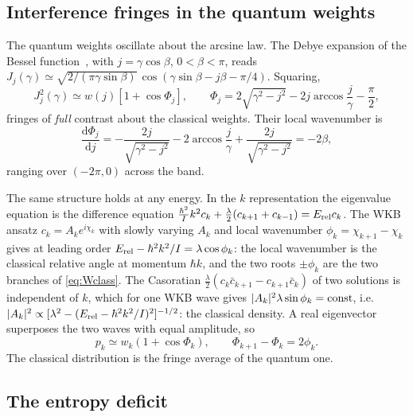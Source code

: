 \documentclass[preprint,12pt]{elsarticle}
\newcommand{\dd}{\mathrm{d}}
\newcommand{\Erel}{E_{\rm rel}}
\begin{document}
\subsection{Interference fringes in the quantum weights}

The quantum weights oscillate about the arcsine law. The Debye expansion of the
Bessel function~\cite{DLMF10}, with $j=\gamma\cos\beta$, $0<\beta<\pi$, reads
$J_{j}(\gamma)\simeq\sqrt{2/(\pi\gamma\sin\beta)}\,
\cos(\gamma\sin\beta-j\beta-\pi/4)$. Squaring,
\begin{equation}
J_{j}^{2}(\gamma)\simeq w(j)\left[1+\cos\Phi_{j}\right],\qquad
\Phi_{j}=2\sqrt{\gamma^{2}-j^{2}}-2j\arccos\frac{j}{\gamma}-\frac{\pi}{2},
\label{eq:fringes}
\end{equation}
fringes of \emph{full} contrast about the classical weights. Their local
wavenumber is
\begin{equation}
\frac{\dd\Phi_{j}}{\dd j}=-\frac{2j}{\sqrt{\gamma^{2}-j^{2}}}
-2\arccos\frac{j}{\gamma}+\frac{2j}{\sqrt{\gamma^{2}-j^{2}}}=-2\beta,
\label{eq:wavenumber}
\end{equation}
ranging over $(-2\pi,0)$ across the band.

The same structure holds at any energy. In the $k$ representation the
eigenvalue equation is the difference equation
$\frac{\hbar^{2}}{I}k^{2}c_{k}+\frac{\lambda}{2}(c_{k+1}+c_{k-1})=\Erel c_{k}$.
The WKB ansatz $c_{k}=A_{k}e^{i\chi_{k}}$ with slowly varying $A_{k}$ and local
wavenumber $\phi_{k}=\chi_{k+1}-\chi_{k}$ gives at leading order
$\Erel-\hbar^{2}k^{2}/I=\lambda\cos\phi_{k}$: the local wavenumber is the
classical relative angle at momentum $\hbar k$, and the two roots $\pm\phi_{k}$
are the two branches of \eqref{eq:Wclass}. The Casoratian
$\tfrac{\lambda}{2}(c_{k}\bar c_{k+1}-c_{k+1}\bar c_{k})$ of two solutions is
independent of $k$, which for one WKB wave gives
$|A_{k}|^{2}\lambda\sin\phi_{k}={\rm const}$, i.e.\
$|A_{k}|^{2}\propto[\lambda^{2}-(\Erel-\hbar^{2}k^{2}/I)^{2}]^{-1/2}$: the
classical density. A real eigenvector superposes the two waves with equal
amplitude, so
\begin{equation}
p_{k}\simeq w_{k}\left(1+\cos\Phi_{k}\right),\qquad
\Phi_{k+1}-\Phi_{k}=2\phi_{k}.
\label{eq:fringesgen}
\end{equation}
The classical distribution is the fringe average of the quantum one.

\subsection{The entropy deficit}
\end{document}
